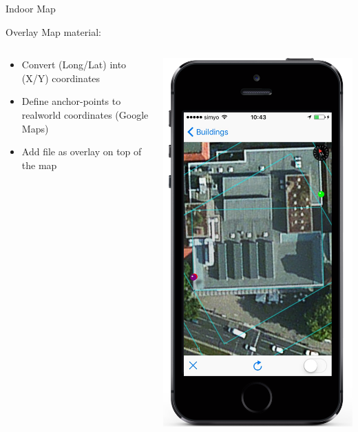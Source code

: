 \documentclass[11pt]{beamer}
\begin{document}
\begin{frame}{Indoor Map}

Overlay Map material:

  \begin{columns}[T]
  \begin{column}{.6\textwidth}
  \begin{itemize}
    \item Convert (Long/Lat) into (X/Y) coordinates
    \item Define anchor-points to realworld coordinates (Google Maps)
    \item Add file as overlay on top of the map
  \end{itemize}
  \end{column}
  \begin{column}{.4\textwidth}
  \includegraphics[scale=0.25]{mapfirststep}
  \end{column}
\end{columns}


\end{frame}
\end{document}
